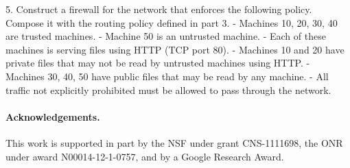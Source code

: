 \documentclass{article}
\begin{document}
5. Construct a firewall for the network that enforces the following policy.
Compose it with the routing policy defined in part 3.
  - Machines 10, 20, 30, 40 are trusted machines.  
  - Machine 50 is an untrusted machine.  
  - Each of these machines is serving files using HTTP (TCP port 80).  
  - Machines 10 and 20 have private files that may not be read by untrusted machines using HTTP.  
  - Machines 30, 40, 50 have public files that may be read by any machine.
  - All traffic not explicitly prohibited must be allowed to pass through the network.



\paragraph*{Acknowledgements.}
%
This work is supported in part by the NSF under grant
CNS-1111698, the ONR under award N00014-12-1-0757, and by a Google
Research Award.

{

}
\end{document}
